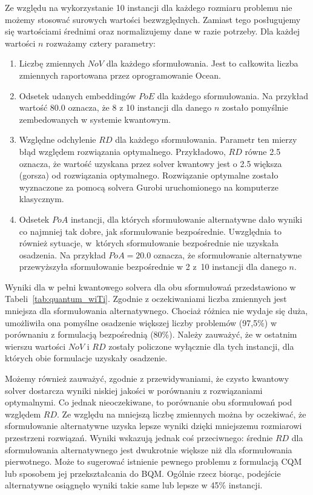 Ze względu na wykorzystanie 10 instancji dla każdego rozmiaru problemu nie możemy stosować surowych wartości bezwzględnych. Zamiast tego posługujemy się wartościami średnimi oraz normalizujemy dane w razie potrzeby. Dla każdej wartości $n$ rozważamy cztery parametry:
%
\begin{enumerate}
    \item Liczbę zmiennych $\mathit{NoV}$ dla każdego sformułowania. Jest to całkowita liczba zmiennych raportowana przez oprogramowanie Ocean.

    \item Odsetek udanych embeddingów $\mathit{PoE}$ dla każdego sformułowania. Na przykład wartość 80.0 oznacza, że 8 z 10 instancji dla danego $n$ zostało pomyślnie zembedowanych w systemie kwantowym.

    \item Względne odchylenie $\mathit{RD}$ dla każdego sformułowania. Parametr ten mierzy błąd względem rozwiązania optymalnego. Przykładowo, $\mathit{RD}$ równe 2.5 oznacza, że wartość uzyskana przez solver kwantowy jest o 2.5 większa (gorsza) od rozwiązania optymalnego. Rozwiązanie optymalne zostało wyznaczone za pomocą solvera Gurobi uruchomionego na komputerze klasycznym.

    \item Odsetek $\mathit{PoA}$ instancji, dla których sformułowanie alternatywne dało wyniki co najmniej tak dobre, jak sformułowanie bezpośrednie. Uwzględnia to również sytuacje, w~których sformułowanie bezpośrednie nie uzyskała osadzenia. Na przykład $\mathit{PoA}=20.0$ oznacza, że sformułowanie alternatywne przewyższyła sformułowanie bezpośrednie w 2 z~10 instancji dla danego $n$. 
\end{enumerate}

Wyniki dla w pełni kwantowego solvera dla obu sformułowań przedstawiono w Tabeli~\ref{tab:quantum_wiTi}. Zgodnie z oczekiwaniami liczba zmiennych jest mniejsza dla sformułowania alternatywnego. Chociaż różnica nie wydaje się duża, umożliwiła ona pomyślne osadzenie większej liczby problemów (97,5\%) w porównaniu z formulacją bezpośrednią (80\%). Należy zauważyć, że w ostatnim wierszu wartości $\mathit{NoV}$ i $\mathit{RD}$ zostały policzone wyłącznie dla tych instancji, dla których obie formulacje uzyskały osadzenie.

Możemy również zauważyć, zgodnie z przewidywaniami, że czysto kwantowy solver dostarcza wyniki niskiej jakości w porównaniu z rozwiązaniami optymalnymi. Co jednak nieoczekiwane, to porównanie obu sformułowań pod względem $\mathit{RD}$. Ze względu na mniejszą liczbę zmiennych można by oczekiwać, że sformułowanie alternatywne uzyska lepsze wyniki dzięki mniejszemu rozmiarowi przestrzeni rozwiązań. Wyniki wskazują jednak coś przeciwnego: średnie $\mathit{RD}$ dla sformułowania alternatywnego jest dwukrotnie większe niż dla sformułowania pierwotnego. Może to sugerować istnienie pewnego problemu z formulacją CQM lub sposobem jej przekształcania do BQM. Ogólnie rzecz biorąc, podejście alternatywne osiągnęło wyniki takie same lub lepsze w 45\% instancji.

